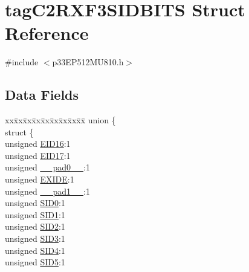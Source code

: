 \hypertarget{structtag_c2_r_x_f3_s_i_d_b_i_t_s}{}\section{tag\+C2\+R\+X\+F3\+S\+I\+D\+B\+I\+TS Struct Reference}
\label{structtag_c2_r_x_f3_s_i_d_b_i_t_s}


{\ttfamily \#include $<$p33\+E\+P512\+M\+U810.\+h$>$}

\subsection*{Data Fields}
\begin{DoxyCompactItemize}
\item 
\begin{tabbing}
xx\=xx\=xx\=xx\=xx\=xx\=xx\=xx\=xx\=\kill
union \{\\
\>struct \{\\
\>\>unsigned \hyperlink{structtag_c2_r_x_f3_s_i_d_b_i_t_s_a6dd5663b0c9838c56db040560ca0efa1}{EID16}:1\\
\>\>unsigned \hyperlink{structtag_c2_r_x_f3_s_i_d_b_i_t_s_aa648615464b0eb29967529333eee9fd9}{EID17}:1\\
\>\>unsigned \hyperlink{structtag_c2_r_x_f3_s_i_d_b_i_t_s_adf71f3d8410c1f1dbbc96680a92c49af}{\_\_pad0\_\_}:1\\
\>\>unsigned \hyperlink{structtag_c2_r_x_f3_s_i_d_b_i_t_s_a09ff1c1be3927220bd3dfbc10edfe243}{EXIDE}:1\\
\>\>unsigned \hyperlink{structtag_c2_r_x_f3_s_i_d_b_i_t_s_acaf2d0924a107ec6e8d2e31febaf66f9}{\_\_pad1\_\_}:1\\
\>\>unsigned \hyperlink{structtag_c2_r_x_f3_s_i_d_b_i_t_s_a1ca276ac15df60e1f7b9a6d0011ade93}{SID0}:1\\
\>\>unsigned \hyperlink{structtag_c2_r_x_f3_s_i_d_b_i_t_s_a3405d354f81391f879648f69f504dfc8}{SID1}:1\\
\>\>unsigned \hyperlink{structtag_c2_r_x_f3_s_i_d_b_i_t_s_ad744966dfc49307f731b7045b01b94e5}{SID2}:1\\
\>\>unsigned \hyperlink{structtag_c2_r_x_f3_s_i_d_b_i_t_s_a9345f3e64720be93e83d8dfc827f3f45}{SID3}:1\\
\>\>unsigned \hyperlink{structtag_c2_r_x_f3_s_i_d_b_i_t_s_aefb106fed4bb40e2c3c71ac612c554e3}{SID4}:1\\
\>\>unsigned \hyperlink{structtag_c2_r_x_f3_s_i_d_b_i_t_s_a0f221b3c9612231686bf87ccdcec8489}{SID5}:1\\

\end{tabbing}
\end{DoxyCompactItemize}

